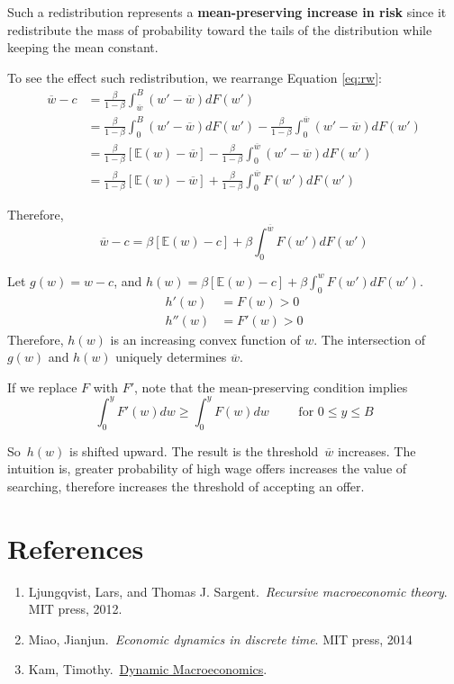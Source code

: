 \documentclass[10pt,a4]{article}
\providecommand{\tightlist}{\setlength{\itemsep}{0pt}\setlength{\parskip}{0pt}}%
\begin{document}
Such a redistribution represents a \textbf{mean-preserving increase in
risk} since it redistribute the mass of probability toward the tails of
the distribution while keeping the mean constant.

To see the effect such redistribution, we rearrange Equation \eqref{eq:rw}:
\[
\begin{aligned}
\overline{w} - c &= \frac{\beta}{1-\beta}\int_{\overline{w}}^{B} (w'-\overline{w}) dF(w') \\
&= \frac{\beta}{1-\beta}\int_{0}^{B} (w'-\overline{w}) dF(w') - \frac{\beta}{1-\beta}\int_{0}^{\overline{w}} (w'-\overline{w}) dF(w') \\
&= \frac{\beta}{1-\beta}[\mathbb{E}(w) - \overline{w}] - \frac{\beta}{1-\beta}\int_{0}^{\overline{w}} (w'-\overline{w}) dF(w') \\
&= \frac{\beta}{1-\beta}[\mathbb{E}(w) - \overline{w}] + \frac{\beta}{1-\beta}\int_{0}^{\overline{w}} F(w') dF(w')
\end{aligned}
\]

Therefore, 
$$ \overline{w} - c = \beta[\mathbb{E}(w) - c] + \beta\int_{0}^{\overline{w}} F(w') dF(w') $$



Let $g(w) = w - c$, and $h(w) = \beta[\mathbb{E}(w) - c] + \beta\int_{0}^{w} F(w') dF(w') $. 
\[
\begin{aligned}
h'(w) &= F(w) > 0 \\
h''(w) &= F'(w) > 0
\end{aligned}
\]
Therefore, $h(w)$ is an increasing convex function of $w$. The intersection of $g(w)$ and $h(w)$ uniquely determines $\overline{w}$.

If we replace $F$ with $F'$, note that the mean-preserving condition implies
$$ \int_0^y F'(w) dw \ge \int_0^y F(w) dw \qquad\textrm{ for } 0 \le y \le B$$

So~\(h\left(w\right)\) is shifted upward. The result is the
threshold~\(\overline{w}\) increases. The intuition is, greater
probability of high wage offers increases the value of searching,
therefore increases the threshold of accepting an offer.~

\newpage

\section{References}

{\label{891579}}

\begin{enumerate}
\tightlist
\item
  Ljungqvist, Lars, and Thomas J. Sargent.~\emph{Recursive macroeconomic
  theory}. MIT press, 2012.
\item
  Miao, Jianjun.~\emph{Economic dynamics in discrete time}. MIT press,
  2014
\item
  Kam,
  Timothy.~\href{https://phantomachine.github.io/econ8022/index.html\#}{Dynamic
  Macroeconomics}.
\end{enumerate}

\par\null\par\null

\clearpage
\end{document}
